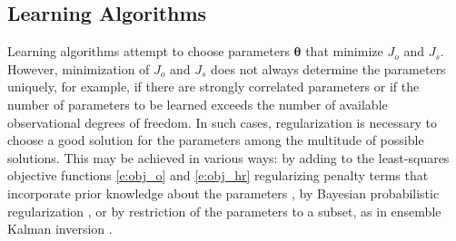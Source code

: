 \documentclass[draft]{agujournal}
\renewcommand{\vec}[1]{\boldsymbol{{#1}}}
\begin{document}
\subsection{Learning Algorithms}

Learning algorithms attempt to choose parameters $\vec{\theta}$ that minimize $J_o$ and $J_s$. However, minimization of $J_o$ and $J_s$ does not always determine the parameters uniquely, for example, if there are strongly correlated parameters or if the number of parameters to be learned exceeds the number of available observational degrees of freedom. In such cases, regularization is necessary to choose a good solution for the parameters among the multitude of possible solutions. This may be achieved in various ways: by adding to the least-squares objective functions \eqref{e:obj_o} and \eqref{e:obj_hr} regularizing penalty terms that incorporate prior knowledge about the parameters \citep{Engl96}, by Bayesian probabilistic regularization \citep{Kaipio05a}, or by restriction of the parameters to a subset, as in ensemble Kalman inversion \citep{Iglesias13a}. 
\end{document}
